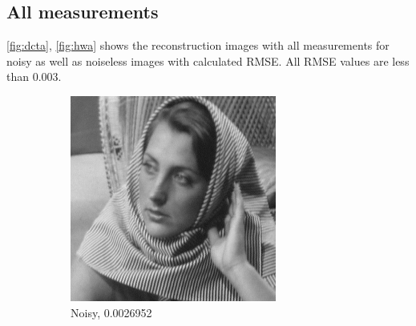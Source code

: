 \documentclass[a4paper]{article}
\begin{document}
\subsection{All measurements}
\ref{fig:dcta}, \ref{fig:hwa} shows the reconstruction images with all measurements for noisy as well as noiseless images with calculated RMSE. All RMSE values are less than 0.003.
\begin{figure}[H]
    \centering
    \begin{subfigure}{0.24\linewidth}
        \centering
        \includegraphics[width = \linewidth]{dct2D/barbara256 reconstructed using all measurements, with noise.png}
        \caption{Noisy, 0.0026952}
    \end{subfigure}
    \begin{subfigure}{0.24\linewidth}
        \centering

\end{subfigure}
\end{figure}
\end{document}
